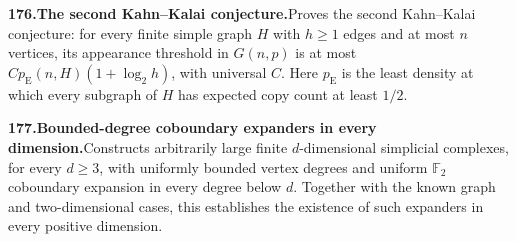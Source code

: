 \documentclass[11pt,a4paper]{article}
\begin{document}
  \par \begin{minipage}{\linewidth}
  \fontsize{10.5}{12.6}\selectfont\RaggedRight
  \hypertarget{result 176}{}
  {\bfseries\textcolor{muted}{176.}\enspace The second Kahn--Kalai conjecture.}\enspace Proves the second Kahn--Kalai conjecture: for every finite simple graph $H$ with $h\ge1$ edges and at most $n$ vertices, its appearance threshold in $G(n,p)$ is at most $C p_{\mathrm E}(n,H)(1+\log_2 h)$, with universal $C$. Here $p_{\mathrm E}$ is the least density at which every subgraph of $H$ has expected copy count at least $1/2$.\par
  \end{minipage}\par\vspace{5pt}



  \par \begin{minipage}{\linewidth}
  \fontsize{10.5}{12.6}\selectfont\RaggedRight
  \hypertarget{result 177}{}
  {\bfseries\textcolor{muted}{177.}\enspace Bounded-degree coboundary expanders in every dimension.}\enspace Constructs arbitrarily large finite $d$-dimensional simplicial complexes, for every $d\ge3$, with uniformly bounded vertex degrees and uniform $\mathbb F_2$ coboundary expansion in every degree below $d$. Together with the known graph and two-dimensional cases, this establishes the existence of such expanders in every positive dimension.\par
  \end{minipage}\par\vspace{5pt}
\end{document}

